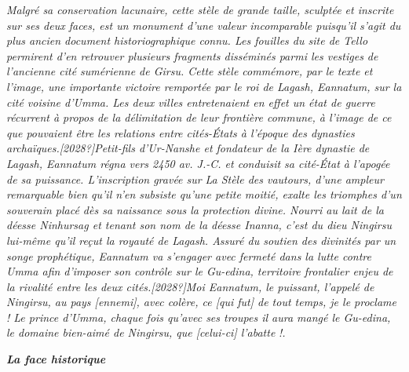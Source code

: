 \documentclass[a4paper,10pt]{article}
\begin{document}
\textit{Malgré sa conservation lacunaire, cette stèle de grande taille,
sculptée et inscrite sur ses deux faces, est un monument
d'une valeur incomparable puisqu'il
s'agit du plus ancien document historiographique
connu. Les fouilles du site de Tello permirent d'en
retrouver plusieurs fragments disséminés parmi les vestiges de
l'ancienne cité sumérienne de Girsu. Cette stèle
commémore, par le texte et l'image, une importante
victoire remportée par le roi de Lagash, Eannatum, sur la cité voisine
d'Umma. Les deux villes entretenaient en effet un état
de guerre récurrent à propos de la délimitation de leur frontière
commune, à l'image de ce que pouvaient être les
relations entre cités-États à l'époque des dynasties
archaïques.[2028?]Petit-fils d'Ur-Nanshe et fondateur
de la Ière dynastie de Lagash, Eannatum régna vers 2450 av. J.-C. et
conduisit sa cité-État à l'apogée de sa puissance.
L'inscription gravée sur }\textit{La Stèle des
vautours}\textit{, d'une ampleur remarquable bien
qu'il n'en subsiste
qu'une petite moitié, exalte les triomphes
d'un souverain placé dès sa naissance sous la
protection divine. Nourri au lait de la déesse Ninhursag et tenant son
nom de la déesse Inanna, c'est du dieu Ningirsu
lui-même qu'il reçut la royauté de Lagash. Assuré du
soutien des divinités par un songe prophétique, Eannatum va
s'engager avec fermeté dans la lutte contre Umma afin
d'imposer son contrôle sur le Gu-edina, territoire
frontalier enjeu de la rivalité entre les deux
cités.[2028?]{\textquotedbl}}\textit{Moi Eannatum, le puissant,
l'appelé de Ningirsu, au pays [ennemi], avec colère,
ce [qui fut] de tout temps, je le proclame ! Le prince
d'Umma, chaque fois qu'avec ses
troupes il aura mangé le Gu-edina, le domaine bien-aimé de Ningirsu,
que [celui-ci] l'abatte }\textit{!{\textquotedbl}.}

\textbf{\textit{La face {\textquotedbl}historique{\textquotedbl}}}
\end{document}
